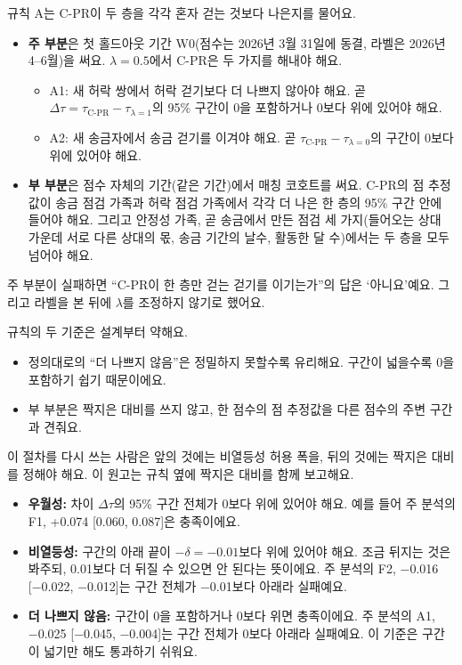 규칙 A는 C-PR이 두 층을 각각 혼자 걷는 것보다 나은지를 물어요.
\begin{itemize}
\item \textbf{주 부분}은 첫 홀드아웃 기간 W0(점수는 2026년 3월 31일에 동결, 라벨은 2026년 4–6월)을 써요. $\lambda=0.5$에서 C-PR은 두 가지를 해내야 해요.
  \begin{itemize}
  \item A1: 새 허락 쌍에서 허락 걷기보다 더 나쁘지 않아야 해요. 곧 $\Delta\tau=\tau_{\text{C-PR}}-\tau_{\lambda=1}$의 95\% 구간이 0을 포함하거나 0보다 위에 있어야 해요.
  \item A2: 새 송금자에서 송금 걷기를 이겨야 해요. 곧 $\tau_{\text{C-PR}}-\tau_{\lambda=0}$의 구간이 0보다 위에 있어야 해요.
  \end{itemize}
\item \textbf{부 부분}은 점수 자체의 기간(같은 기간)에서 매칭 코호트를 써요. C-PR의 점 추정값이 송금 점검 가족과 허락 점검 가족에서 각각 더 나은 한 층의 95\% 구간 안에 들어야 해요. 그리고 안정성 가족, 곧 송금에서 만든 점검 세 가지(들어오는 상대 가운데 서로 다른 상대의 몫, 송금 기간의 날수, 활동한 달 수)에서는 두 층을 모두 넘어야 해요.
\end{itemize}
주 부분이 실패하면 “C-PR이 한 층만 걷는 걷기를 이기는가”의 답은 ‘아니요’예요. 그리고 라벨을 본 뒤에 $\lambda$를 조정하지 않기로 했어요.

규칙의 두 기준은 설계부터 약해요.
\begin{itemize}
\item 정의대로의 “더 나쁘지 않음”은 정밀하지 못할수록 유리해요. 구간이 넓을수록 0을 포함하기 쉽기 때문이에요.
\item 부 부분은 짝지은 대비를 쓰지 않고, 한 점수의 점 추정값을 다른 점수의 주변 구간과 견줘요.
\end{itemize}
이 절차를 다시 쓰는 사람은 앞의 것에는 비열등성 허용 폭을, 뒤의 것에는 짝지은 대비를 정해야 해요. 이 원고는 규칙 옆에 짝지은 대비를 함께 보고해요.

\begin{puri}[판정 기준 세 가지]
\begin{itemize}
\item \textbf{우월성:} 차이 $\Delta\tau$의 95\% 구간 전체가 0보다 위에 있어야 해요. 예를 들어 주 분석의 F1, +0.074 [0.060, 0.087]은 충족이에요.
\item \textbf{비열등성:} 구간의 아래 끝이 $-\delta=-0.01$보다 위에 있어야 해요. 조금 뒤지는 것은 봐주되, 0.01보다 더 뒤질 수 있으면 안 된다는 뜻이에요. 주 분석의 F2, −0.016 [−0.022, −0.012]는 구간 전체가 −0.01보다 아래라 실패예요.
\item \textbf{더 나쁘지 않음:} 구간이 0을 포함하거나 0보다 위면 충족이에요. 주 분석의 A1, −0.025 [−0.045, −0.004]는 구간 전체가 0보다 아래라 실패예요. 이 기준은 구간이 넓기만 해도 통과하기 쉬워요.
\end{itemize}
\end{puri}


